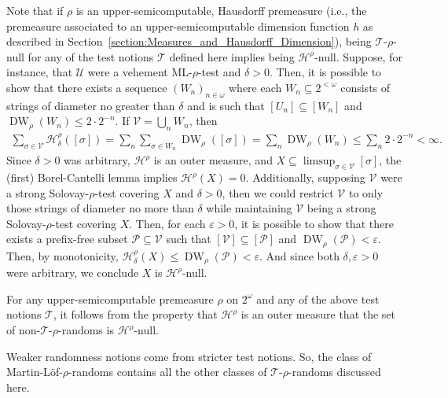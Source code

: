 Note that if $\rho$ is an upper-semicomputable, Hausdorff premeasure (i.e., the premeasure associated to an upper-semicomputable dimension function $h$ as described in Section~\ref{section:Measures_and_Hausdorff_Dimension}), being $\mathcal{T}$-$\rho$-null for any of the test notions $\mathcal{T}$ defined here implies being $\mathcal{H}^\rho$-null. Suppose, for instance, that $\mathcal{U}$ were a vehement ML-$\rho$-test and $\delta > 0$. Then, it is possible to show that there exists a sequence $(W_n)_{n \in \omega}$ where each $W_n \subseteq 2^{<\omega}$ consists of strings of diameter no greater than $\delta$ and is such that $[U_n] \subseteq [W_n]$ and $\operatorname{DW}_\rho(W_n) \leq 2 \cdot 2^{-n}$. If $\mathcal{V} = \bigcup_n W_n$, then 
\begin{align*}
    \sum_{\sigma \in \mathcal{V}} \mathcal{H}_\delta^\rho([\sigma]) = \sum_n \sum_{\sigma \in W_n} \operatorname{DW}_\rho([\sigma]) = \sum_n \operatorname{DW}_\rho(W_n) \leq \sum_n 2 \cdot 2^{-n} < \infty.
\end{align*}
Since $\delta > 0$ was arbitrary, $\mathcal{H}^\rho$ is an outer measure, and $X \subseteq \limsup_{\sigma \in \mathcal{V}} [\sigma]$, the (first) Borel-Cantelli lemma implies $\mathcal{H}^\rho(X) = 0$. 
Additionally, supposing $\mathcal{V}$ were a strong Solovay-$\rho$-test covering $X$ and $\delta > 0$, then we could restrict $\mathcal{V}$ to only those strings of diameter no more than $\delta$ while maintaining $\mathcal{V}$ being a strong Solovay-$\rho$-test covering $X$. Then, for each $\varepsilon > 0$, it is possible to show that there exists a prefix-free subset $\mathcal{P} \subseteq \mathcal{V}$ such that $[\mathcal{V}] \subseteq [\mathcal{P}]$ and $\operatorname{DW}_\rho(\mathcal{P}) < \varepsilon$. Then, by monotonicity, $\mathcal{H}^\rho_\delta(X) \leq \operatorname{DW}_\rho(\mathcal{P}) < \varepsilon$. And since both $\delta, \varepsilon > 0$ were arbitrary, we conclude $X$ is $\mathcal{H}^\rho$-null.

For any upper-semicomputable premeasure $\rho$ on $2^\omega$ and any of the above test notions $\mathcal{T}$, it follows from the property that $\mathcal{H}^\rho$ is an outer measure that the set of non-$\mathcal{T}$-$\rho$-randoms is $\mathcal{H}^\rho$-null.

Weaker randomness notions come from stricter test notions. So, the class of Martin-L{\"o}f-$\rho$-randoms contains all the other classes of $\mathcal{T}$-$\rho$-randoms discussed here. 


